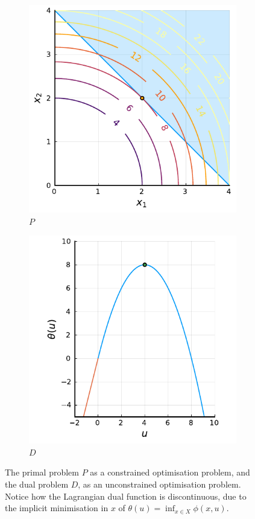 \begin{figure}
	\centering
	\begin{subfigure}{0.45\textwidth}
		\centering
		\includegraphics[width=\textwidth]{part_2/chapter_8/figures/ex1_1.pdf}
		\caption{$P$}\label{fig:ex1_P}
	\end{subfigure}
	\begin{subfigure}{0.45\textwidth}
		\centering
		\includegraphics[width=\textwidth]{part_2/chapter_8/figures/ex1_2.pdf}
		\caption{$D$}\label{fig:ex1_D}
	\end{subfigure}
	\caption{The primal problem $P$ as a constrained optimisation problem, and the dual problem $D$, as an unconstrained optimisation problem. Notice how the Lagrangian dual function is discontinuous, due to the implicit minimisation in $x$ of $\theta(u) = \inf_{x \in X} \phi(x,u)$.}	
\end{figure}

